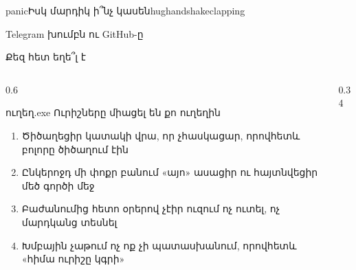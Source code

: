 
%
  {   }%
  {panic}{Իսկ մարդիկ ի՞նչ կասեն}{{hug}{handshake}{clapping}}

\begin{frame}{Telegram խումբն ու GitHub-ը}
  \telegramframebody
\end{frame}

\begin{frame}{Քեզ հետ եղե՞լ է}
  \begin{columns}[c]
    \begin{column}{0.6\textwidth}
      \begin{popup}{ուղեղ.exe}
        {\blackfont\large Ուրիշները միացել են քո ուղեղին}\par\medskip
        \begin{enumerate}
          \item<2-> Ծիծաղեցիր կատակի վրա, որ չհասկացար, որովհետև բոլորը ծիծաղում էին
          \item<3-> Ընկերոջդ մի փոքր բանում «այո» ասացիր ու հայտնվեցիր մեծ գործի մեջ
          \item<4-> Բաժանումից հետո օրերով չէիր ուզում ոչ ուտել, ոչ մարդկանց տեսնել
          \item<5-> Խմբային չաթում ոչ ոք չի պատասխանում, որովհետև «հիմա ուրիշը կգրի»
        \end{enumerate}
      \end{popup}
    \end{column}
    \begin{column}{0.34\textwidth}
      \centering
      \par\medskip
    \end{column}
  \end{columns}
\end{frame}

